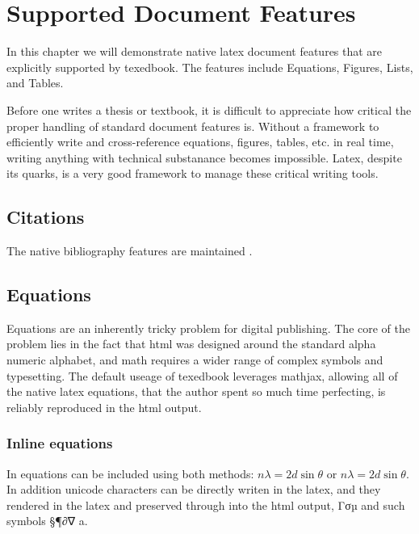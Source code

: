 \documentclass{article}
\begin{document}
\section{Supported Document Features}
In this chapter we will demonstrate native latex document features that are explicitly supported by texedbook. The features include Equations, Figures, Lists, and Tables.

Before one writes a thesis or textbook, it is difficult to appreciate how critical the proper handling of standard document features is. Without a framework to efficiently write and cross-reference equations, figures, tables, etc. in real time, writing anything with technical substanance becomes impossible. Latex, despite its quarks, is a very good framework to manage these critical writing tools.

\subsection{Citations}
The native bibliography features are maintained \cite{Ohno2007}. 

\subsection{Equations}
Equations are an inherently tricky problem for digital publishing. The core of the problem lies in the fact that html was designed around the standard alpha numeric alphabet, and math requires a wider range of complex symbols and typesetting. The default useage of texedbook leverages mathjax, allowing all of the native latex equations, that the author spent so much time perfecting, is reliably reproduced in the html output.


\subsubsection{Inline equations}
In equations can be included using both methods: $n\lambda=2d \sin \theta$ or \( n\lambda=2d \sin \theta \). In addition unicode characters can be directly writen in the latex, and they rendered in the latex and preserved through into the html output, 
Γσµ and such symbols §¶∂∇ a.


\end{document}
